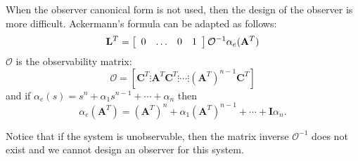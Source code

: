 When the observer canonical form is not used, then the design of the observer is more difficult. Ackermann's formula can be adapted as follows:
\[
{\bf{L}}^T  = \left[ {\begin{array}{*{20}c}
   0 &  \ldots  & 0 & 1  \\
\end{array}} \right]\mathcal{O}^{ - 1} \alpha _e ({\bf{A}}^T )
\]
$\mathcal{O}$ is the observability matrix:
\[
\mathcal{O}=[\mathbf{C}^T\vdots\mathbf{A}^T\mathbf{C}^T\vdots\cdots\vdots(\mathbf{A}^T)^{n-1}\mathbf{C}^T]
\]
and if $\alpha_e(s)=s^n + \alpha_1s^{n-1}+\cdots+\alpha_n$ then \[\alpha_e(\mathbf{A}^T)=(\mathbf{A}^T)^n + \alpha_1(\mathbf{A}^T)^{n-1}+\cdots+\mathbf{I}\alpha_n.\]
 

Notice that if the system is unobservable, then the matrix inverse $\mathcal{O}^{-1}$ does not exist and we cannot design an observer for this system.


 
 

\endinput

